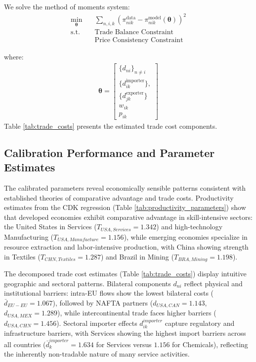 We solve the method of moments system:
\begin{align*}
\min_{\boldsymbol{\theta}} &\quad \sum_{n,i,k} \left( \pi_{nik}^{\text{data}} - \pi_{nik}^{\text{model}}(\boldsymbol{\theta}) \right)^2 \\
\text{s.t.} & \quad \text{Trade Balance Constraint} \\
& \quad \text{Price Consistency Constraint}
\end{align*}

where:
\begin{align*}
\boldsymbol{\theta} = \begin{bmatrix} \{d_{ni}\}_{n \neq i}\\ \{d_{ik}^{\text{importer}}\},\\ \{d_{jk}^{\text{exporter}}\} \\ w_{ik} \\ p_{ik} \end{bmatrix}
\end{align*}
Table \ref{tab:trade_costs} presents the estimated trade cost components.

\subsection{Calibration Performance and Parameter Estimates}

The calibrated parameters reveal economically sensible patterns consistent with established theories of comparative advantage and trade costs. Productivity estimates from the CDK regression (Table \ref{tab:productivity_parameters}) show that developed economies exhibit comparative advantage in skill-intensive sectors: the United States in Services ($T_{USA,Services} = 1.342$) and high-technology Manufacturing ($T_{USA,Manufacture} = 1.156$), while emerging economies specialize in resource extraction and labor-intensive production, with China showing strength in Textiles ($T_{CHN,Textiles} = 1.287$) and Brazil in Mining ($T_{BRA,Mining} = 1.198$).

The decomposed trade cost estimates (Table \ref{tab:trade_costs}) display intuitive geographic and sectoral patterns. Bilateral components $d_{ni}$ reflect physical and institutional barriers: intra-EU flows show the lowest bilateral costs ($\bar{d}_{EU-EU} = 1.067$), followed by NAFTA partners ($d_{USA,CAN} = 1.143$, $d_{USA,MEX} = 1.289$), while intercontinental trade faces higher barriers ($d_{USA,CHN} = 1.456$). Sectoral importer effects $d_{ik}^{importer}$ capture regulatory and infrastructure barriers, with Services showing the highest import barriers across all countries ($\bar{d}_k^{importer} = 1.634$ for Services versus $1.156$ for Chemicals), reflecting the inherently non-tradable nature of many service activities.

